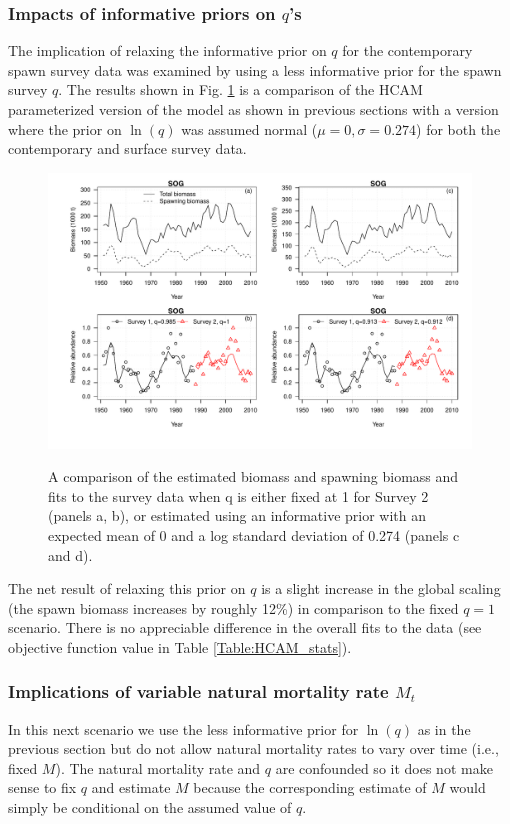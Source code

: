 		\subsubsection{Impacts of informative priors on $q$'s}
The implication of relaxing the informative prior on $q$ for the contemporary spawn survey data was examined by using a less informative prior for the spawn survey $q$. The results shown in Fig. \ref{fig:qFix_qPrior} is a comparison of the HCAM parameterized version of the model as shown in previous sections with a version where the prior on $\ln(q)$ was assumed normal ($\mu=0, \sigma = 0.274$) for both the contemporary and surface survey data.
\begin{figure}[!tbp]
	\includegraphics[width=\textwidth]{../FIGS/iscam_fig_HCAM_qFix_qPrior.pdf}\\
	\caption{A comparison of the estimated biomass and spawning biomass and fits to the survey data when q is either fixed at 1 for Survey 2 (panels a, b), or  estimated using an informative prior with an expected mean of 0 and a log standard deviation of 0.274 (panels c and d).}\label{fig:qFix_qPrior}
\end{figure}

The net result of relaxing this prior on $q$ is a slight increase in the global scaling (the spawn biomass increases by roughly 12\%) in comparison to the fixed $q=1$ scenario.  There is no appreciable difference in the overall fits to the data (see objective function value in Table \ref{Table:HCAM_stats}).
		
		\subsubsection{Implications of variable natural mortality rate $M_t$}
	In this next scenario we use the less informative prior for $\ln(q)$ as in the previous section but do not allow natural mortality rates to vary over time (i.e., fixed $M$).  The natural mortality rate and $q$ are confounded so it does not make sense to fix $q$ and estimate $M$ because the corresponding estimate of $M$ would simply be conditional on the assumed value of $q$.
	
